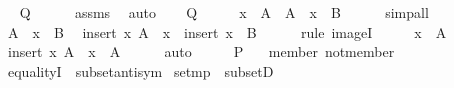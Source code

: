 \begin{isabellebody}
\ \isamarkupfalse%
\ {\isacharquery}{\kern0pt}Q\isanewline
\ \ \ \ \isamarkupfalse%
\ assms\ \isamarkupfalse%
\ auto\isanewline
{}\isamarkupfalse%
\isanewline
\ \ \isamarkupfalse%
\ {\isacharquery}{\kern0pt}Q\isanewline
\ \ \isamarkupfalse%
\ \isamarkupfalse%
\ {\isachardoublequoteopen}x\ {\isasymin}\ A{\isachardoublequoteclose}\ \ {\isachardoublequoteopen}A\ {\isacharminus}{\kern0pt}\ {\isacharbraceleft}{\kern0pt}x{\isacharbraceright}{\kern0pt}\ {\isasymin}\ B{\isachardoublequoteclose}\isanewline
\ \ \ \ \isamarkupfalse%
\ simp{\isacharunderscore}{\kern0pt}all\isanewline
\ \ \isamarkupfalse%
\ {\isacartoucheopen}A\ {\isacharminus}{\kern0pt}\ {\isacharbraceleft}{\kern0pt}x{\isacharbraceright}{\kern0pt}\ {\isasymin}\ B{\isacartoucheclose}\ \isamarkupfalse%
\ {\isachardoublequoteopen}insert\ x\ {\isacharparenleft}{\kern0pt}A\ {\isacharminus}{\kern0pt}\ {\isacharbraceleft}{\kern0pt}x{\isacharbraceright}{\kern0pt}{\isacharparenright}{\kern0pt}\ {\isasymin}\ insert\ x\ {\isacharbackquote}{\kern0pt}\ B{\isachardoublequoteclose}\isanewline
\ \ \ \ \isamarkupfalse%
\ {\isacharparenleft}{\kern0pt}rule\ imageI{\isacharparenright}{\kern0pt}\isanewline
\ \ \isamarkupfalse%
\ \isamarkupfalse%
\ {\isacartoucheopen}x\ {\isasymin}\ A{\isacartoucheclose}\isanewline
\ \ \isamarkupfalse%
\ {\isachardoublequoteopen}insert\ x\ {\isacharparenleft}{\kern0pt}A\ {\isacharminus}{\kern0pt}\ {\isacharbraceleft}{\kern0pt}x{\isacharbraceright}{\kern0pt}{\isacharparenright}{\kern0pt}\ {\isacharequal}{\kern0pt}\ A{\isachardoublequoteclose}\isanewline
\ \ \ \ \isamarkupfalse%
\ auto\isanewline
\ \ \isamarkupfalse%
\ \isamarkupfalse%
\ {\isacharquery}{\kern0pt}P\ \isacommand{{\isachardot}{\kern0pt}}\isamarkupfalse%
\isanewline
{}\isamarkupfalse%
%
\endisatagproof
{\isafoldproof}%
%
\isadelimproof
\isanewline
%
\endisadelimproof
\isanewline
{}\isamarkupfalse%
\ {\isacharparenleft}{\kern0pt}\ member\ not{\isacharunderscore}{\kern0pt}member\isanewline
\isanewline
{}\isamarkupfalse%
\ equalityI\ {\isacharequal}{\kern0pt}\ subset{\isacharunderscore}{\kern0pt}antisym\isanewline
{}\isamarkupfalse%
\ set{\isacharunderscore}{\kern0pt}mp\ {\isacharequal}{\kern0pt}\ subsetD\isanewline

\end{isabellebody}
